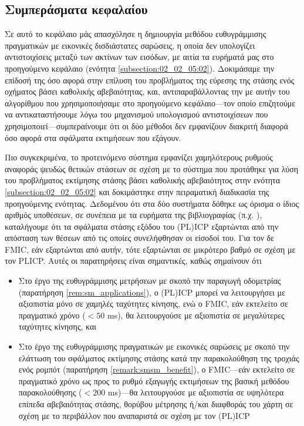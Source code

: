 \subsection{Συμπεράσματα κεφαλαίου}
\label{subsection:02_03_05:01}

Σε αυτό το κεφάλαιο μάς απασχόλησε η δημιουργία μεθόδου ευθυγράμμισης
πραγματικών με εικονικές δισδιάστατες σαρώσεις, η οποία δεν υπολογίζει
αντιστοιχίσεις μεταξύ των ακτίνων των εισόδων, με αιτία τα ευρήματά μας στο
προηγούμενο κεφάλαιο (ενότητα \ref{subsection:02_02_05:02}). Δοκιμάσαμε την
επίδοσή της όσο αφορά στην επίλυση του προβλήματος της εύρεσης της στάσης ενός
οχήματος βάσει καθολικής αβεβαιότητας, και, αντιπαραβάλλοντας την με αυτήν του
αλγορίθμου που χρησιμοποιήσαμε στο προηγούμενο κεφάλαιο---τον οποίο επιζητούμε
να αντικαταστήσουμε λόγω του μηχανισμού υπολογισμού αντιστοιχίσεων που
χρησιμοποιεί---συμπεραίνουμε ότι οι δύο μέθοδοι δεν εμφανίζουν διακριτή διαφορά
όσο αφορά στα σφάλματα εκτιμήσεων που εξάγουν.

Πιο συγκεκριμένα, το προτεινόμενο σύστημα εμφανίζει χαμηλότερους ρυθμούς
αναφοράς ψευδώς θετικών στάσεων σε σχέση με το σύστημα που προτάθηκε για λύση
του προβλήματος εκτίμησης στάσης βάσει καθολικής αβεβαιότητος στην ενότητα
\ref{subsection:02_02_05:02} και δοκιμάστηκε στην πειραματική διαδικασία της
προηγούμενης ενότητας. Δεδομένου ότι στα δύο συστήματα δόθηκε ως όρισμα ο ίδιος
αριθμός υποθέσεων, σε συνέπεια με τα ευρήματα της βιβλιογραφίας (π.χ.
\cite{Olson2009a,bernreiter2021phaser}), καταλήγουμε ότι τα σφάλματα στάσης
εξόδου του (PL)ICP εξαρτώνται από την απόσταση των θέσεων από τις οποίες
συνελήφθησαν οι είσοδοί του. Για τον δε FMIC, εάν εξαρτώνται από αυτήν, τότε
εξαρτώνται σε μικρότερο βαθμό σε σχέση με τον PLICP. Αυτές οι παρατηρήσεις είναι
σημαντικές, καθώς σημαίνουν ότι

\begin{itemize}
  \item Στο έργο της ευθυγράμμισης μετρήσεων με σκοπό την παραγωγή οδομετρίας
        (παρατήρηση \ref{rem:sm_applications}), ο (PL)ICP μπορεί να λειτουργήσει
        με αξιοπιστία μόνο σε χαμηλές ταχύτητες κίνησης, ενώ ο FMIC, εάν
        εκτελείτο σε πραγματικό χρόνο ($< 50$ ms), θα λειτουργούσε με αξιοπιστία
        σε μεγαλύτερες ταχύτητες κίνησης, και
  \item Στο έργο της ευθυγράμμισης πραγματικών με εικονικές σαρώσεις με σκοπό
        την ελάττωση του σφάλματος εκτίμησης στάσης κατά την παρακολούθηση
        της τροχιάς ενός ρομπότ (παρατήρηση \ref{remark:smsm_benefit}), ο
        FMIC---εάν εκτελείτο σε πραγματικό χρόνο ως προς το ρυθμό εξαγωγής
        εκτιμήσεων της βασική μεθόδου παρακολούθησης ($< 200$ ms)---θα
        λειτουργούσε με αξιοπιστία σε υψηλότερα επίπεδα αβεβαιότητας στάσης,
        θορύβου μέτρησης ή/και διαφθοράς του χάρτη σε σχέση με το περιβάλλον
        που αναπαριστά σε σχέση με τον (PL)ICP
\end{itemize}

